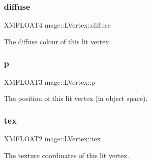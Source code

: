 \subsubsection{\texorpdfstring{diffuse}{diffuse}}
{\footnotesize\ttfamily X\+M\+F\+L\+O\+A\+T4 mage\+::\+L\+Vertex\+::diffuse}

The diffuse colour of this lit vertex. \hypertarget{structmage_1_1_l_vertex_afdf01d172b1992d4e4f37b9ad9fb2d27}{}\label{structmage_1_1_l_vertex_afdf01d172b1992d4e4f37b9ad9fb2d27} 
\subsubsection{\texorpdfstring{p}{p}}
{\footnotesize\ttfamily X\+M\+F\+L\+O\+A\+T3 mage\+::\+L\+Vertex\+::p}

The position of this lit vertex (in object space). \hypertarget{structmage_1_1_l_vertex_abeca49c231f9b85063dbd4c0522d7edc}{}\label{structmage_1_1_l_vertex_abeca49c231f9b85063dbd4c0522d7edc} 
\subsubsection{\texorpdfstring{tex}{tex}}
{\footnotesize\ttfamily X\+M\+F\+L\+O\+A\+T2 mage\+::\+L\+Vertex\+::tex}

The texture coordinates of this lit vertex. 
